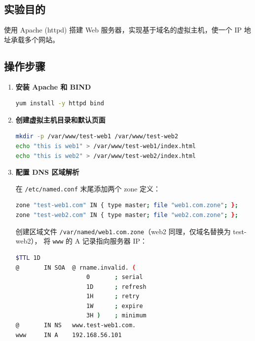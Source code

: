 \documentclass[12pt,a4paper]{ctexart}
\begin{document}
\subsection{实验目的}

使用 Apache (httpd) 搭建 Web 服务器，实现基于域名的虚拟主机，使一个 IP 地址承载多个网站。

\subsection{操作步骤}

\begin{enumerate}[label=\arabic*.,leftmargin=*]

  \item \textbf{安装 Apache 和 BIND}

  \begin{cmdbox}
  \begin{lstlisting}[language=bash]
yum install -y httpd bind
  \end{lstlisting}
  \end{cmdbox}

  \item \textbf{创建虚拟主机目录和默认页面}

  \begin{cmdbox}
  \begin{lstlisting}[language=bash]
mkdir -p /var/www/test-web1 /var/www/test-web2
echo "this is web1" > /var/www/test-web1/index.html
echo "this is web2" > /var/www/test-web2/index.html
  \end{lstlisting}
  \end{cmdbox}

  \item \textbf{配置 DNS 区域解析}

  在 \texttt{/etc/named.conf} 末尾添加两个 zone 定义：

  \begin{cmdbox}
  \small
  \begin{lstlisting}[language=bash]
zone "test-web1.com" IN { type master; file "web1.com.zone"; };
zone "test-web2.com" IN { type master; file "web2.com.zone"; };
  \end{lstlisting}
  \end{cmdbox}

  创建区域文件 \texttt{/var/named/web1.com.zone}（web2 同理，仅域名替换为 test-web2），
  将 \texttt{www} 的 A 记录指向服务器 IP：

  \begin{cmdbox}
  \small
  \begin{lstlisting}[language=bash]
$TTL 1D
@       IN SOA  @ rname.invalid. (
                    0       ; serial
                    1D      ; refresh
                    1H      ; retry
                    1W      ; expire
                    3H )    ; minimum
@       IN NS   www.test-web1.com.
www     IN A    192.168.56.101
  \end{lstlisting}
  \end{cmdbox}


\end{enumerate}
\end{document}
